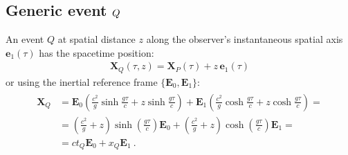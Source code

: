\documentclass[letterpaper,10pt,english]{jupyterBook}
\begin{document}
\subsection{Generic event \protect\(Q\protect\)}
\label{\detokenize{ch/relativity-special/rindler:generic-event-q}}\label{\detokenize{ch/relativity-special/rindler:relativity-special-rindler-construction-generic-event}}
\sphinxAtStartPar
An event \(Q\) at spatial distance \(z\) along the observer’s instantaneous spatial axis \(\mathbf{e}_1(\tau)\) has the spacetime position:
\begin{equation*}
\begin{split}\mathbf{X}_Q(\tau, z) = \mathbf{X}_P(\tau) + z \, \mathbf{e}_1(\tau)\end{split}
\end{equation*}
\sphinxAtStartPar
or using the inertial reference frame \(\{\mathbf{E}_0, \mathbf{E}_1\}\):
\begin{equation}\label{equation:ch/relativity-special/rindler:eq:rindler:generic-events}
\begin{split}\begin{aligned}
  \mathbf{X}_Q
  & = \mathbf{E}_0 \left( \frac{c^2}{g} \sinh\frac{g\tau}{c} + z \sinh\frac{g\tau}{c} \right) + \mathbf{E}_1 \left( \frac{c^2}{g} \cosh\frac{g\tau}{c} + z \cosh\frac{g\tau}{c} \right) = \\
  & = \left( \frac{c^2}{g} + z \right) \sinh\left(\frac{g\tau}{c}\right) \mathbf{E}_0 + \left( \frac{c^2}{g} + z \right) \cosh\left(\frac{g\tau}{c}\right) \mathbf{E}_1 = \\
  & = ct_Q \mathbf{E}_0 + x_Q \mathbf{E}_1 \ .
\end{aligned}\end{split}
\end{equation}
\end{document}
